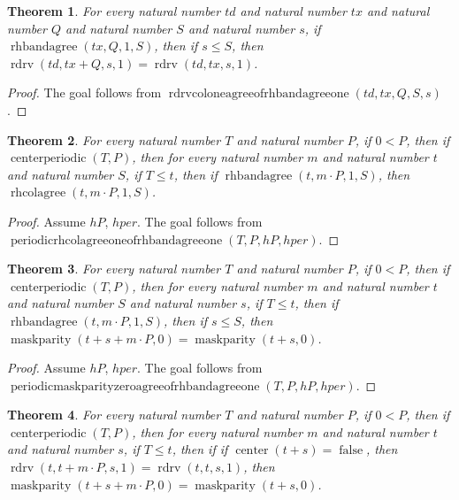 \documentclass[11pt]{article}
\newtheorem{theorem}{Theorem}[section]
\theoremstyle{definition}
\begin{document}
\begin{theorem}
\label{ll:paper:rdrv-col-one-agree-of-rhbandagree-one}
For every natural number \(td\) and natural number \(tx\) and natural number \(Q\) and natural number \(S\) and natural number \(s\), if \(\operatorname{rhbandagree}(tx, Q, 1, S)\), then if \(s \le S\), then \(\operatorname{rdrv}(td, tx + Q, s, 1) = \operatorname{rdrv}(td, tx, s, 1)\).
\end{theorem}
\begin{proof}
The goal follows from \(\operatorname{rdrvcoloneagreeofrhbandagreeone}(td, tx, Q, S, s)\).
\end{proof}
\begin{theorem}
\label{ll:paper:periodic-rhcolagree-one-of-rhbandagree-one}
For every natural number \(T\) and natural number \(P\), if \(0 < P\), then if \(\operatorname{centerperiodic}(T, P)\), then for every natural number \(m\) and natural number \(t\) and natural number \(S\), if \(T \le t\), then if \(\operatorname{rhbandagree}(t, m \cdot P, 1, S)\), then \(\operatorname{rhcolagree}(t, m \cdot P, 1, S)\).
\end{theorem}
\begin{proof}
Assume \(hP\), \(hper\).
The goal follows from \(\operatorname{periodicrhcolagreeoneofrhbandagreeone}(T, P, hP, hper)\).
\end{proof}
\begin{theorem}
\label{ll:paper:periodic-maskparity-zero-agree-of-rhbandagree-one}
For every natural number \(T\) and natural number \(P\), if \(0 < P\), then if \(\operatorname{centerperiodic}(T, P)\), then for every natural number \(m\) and natural number \(t\) and natural number \(S\) and natural number \(s\), if \(T \le t\), then if \(\operatorname{rhbandagree}(t, m \cdot P, 1, S)\), then if \(s \le S\), then \(\operatorname{maskparity}(t + s + m \cdot P, 0) = \operatorname{maskparity}(t + s, 0)\).
\end{theorem}
\begin{proof}
Assume \(hP\), \(hper\).
The goal follows from \(\operatorname{periodicmaskparityzeroagreeofrhbandagreeone}(T, P, hP, hper)\).
\end{proof}
\begin{theorem}
\label{ll:paper:periodic-maskparity-zero-agree-of-rdrv-one-agree}
For every natural number \(T\) and natural number \(P\), if \(0 < P\), then if \(\operatorname{centerperiodic}(T, P)\), then for every natural number \(m\) and natural number \(t\) and natural number \(s\), if \(T \le t\), then if if \(\operatorname{center}(t + s) = \operatorname{false}\), then \(\operatorname{rdrv}(t, t + m \cdot P, s, 1) = \operatorname{rdrv}(t, t, s, 1)\), then \(\operatorname{maskparity}(t + s + m \cdot P, 0) = \operatorname{maskparity}(t + s, 0)\).
\end{theorem}
\end{document}
